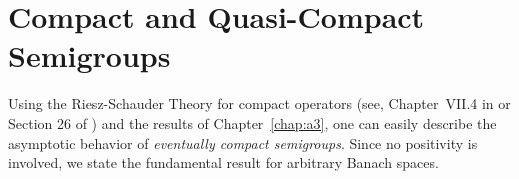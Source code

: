 \section{Compact and Quasi-Compact Semigroups}\label{sec:b4-2}
\hspace{1cm}{\Large by Günther Greiner}
\vspace{.5cm}
\newline
Using the Riesz-Schauder Theory for compact operators (see, \eg
Chapter~VII.4 in \textcite{dunfordschwartz:1958} or Section 26 of \textcite{pietsch:1978}) and the results of Chapter~\ref{chap:a3},  one can easily describe the
asymptotic behavior of \emph{eventually compact semigroups}.
Since no positivity is involved, we state the fundamental result for arbitrary Banach
spaces.

